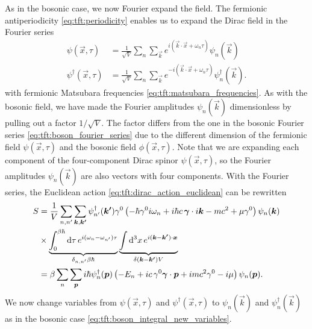 As in the bosonic case, we now Fourier expand the field.
The fermionic antiperiodicity \eqref{eq:tft:periodicity} enables us to expand the Dirac field in the Fourier series
\begin{equation}
\begin{split}
	\psi(\vec{x}, \tau)         &= \frac{1}{\sqrt{V}} \sum_n \sum_\vec{k} e^{i (\vec{k} \cdot \vec{x} + \omega_n \tau)} \psi_{n}(\vec{k}) \\
	\psi^\dagger(\vec{x}, \tau) &= \frac{1}{\sqrt{V}} \sum_n \sum_\vec{k} e^{-i (\vec{k} \cdot \vec{x} + \omega_n \tau)} \psi_{n}^\dagger(\vec{k}) .
\label{eq:tft:dirac_fourier_series}
\end{split}
\end{equation}
with fermionic Matsubara frequencies \eqref{eq:tft:matsubara_frequencies}.
As with the bosonic field, we have made the Fourier amplitudes $\psi_n(\vec{k})$ dimensionless by pulling out a factor $1/\sqrt{V}$.
The factor differs from the one in the bosonic Fourier series \eqref{eq:tft:boson_fourier_series} due to the different dimension of the fermionic field $\psi(\vec{x}, \tau)$ and the bosonic field $\phi(\vec{x}, \tau)$.
Note that we are expanding each component of the four-component Dirac spinor $\psi(\vec{x}, \tau)$, so the Fourier amplitudes $\psi_n(\vec{k})$ are also vectors with four components.
With the Fourier series, the Euclidean action \eqref{eq:tft:dirac_action_euclidean} can be rewritten
\begin{equation}
\begin{split}
	S & = \frac{1}{V} \sum_{n,n'} \sum_{{\bm{k}},{\bm{k'}}} \psi^\dagger_{n'}({\bm{k'}}) \gamma^0 \left( -\hbar \gamma^0 i \omega_n + i \hbar c \, {\bm{\gamma}} \cdot i {\bm{k}} - m c^2 + \mu \gamma^0 \right) \psi_n({\bm{k}}) \\
	  & \times \underbrace{\int_0^{\beta \hbar} \mathop{}\!\mathrm{d} \tau \, e^{i(\omega_n-\omega_{n'})\tau}}_{\delta_{n,n'} \beta \hbar} \underbrace{\int \mathop{}\!\mathrm{d}^3 x \, e^{i({\bm{k}}-{\bm{k'}})\cdot{\bm{x}}}}_{\delta({\bm{k}} - {\bm{k'}}) V} \\
	  & = \beta       \sum_{n}   \sum_{{\bm{p}}}         i \hbar \psi^\dagger_n({\bm{p}})          \left( -E_n + i c \, \gamma^0 {\bm{\gamma}} \cdot {\bm{p}} + i m c^2 \gamma^0 - i \mu \right) \psi_n({\bm{p}}) . \\
\end{split}
\end{equation}
We now change variables from $\psi(\vec{x}, \tau)$ and $\psi^\dagger(\vec{x}, \tau)$ to $\psi_n(\vec{k})$ and $\psi^\dagger_n(\vec{k})$ as in the bosonic case \eqref{eq:tft:boson_integral_new_variables}.
